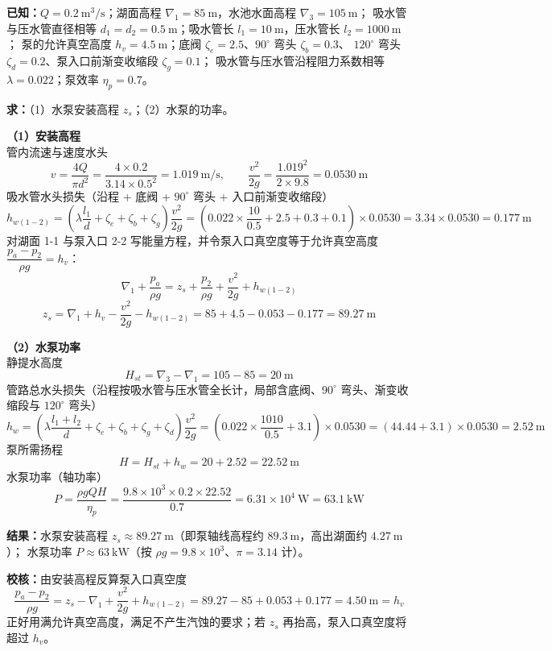\begin{jie}
\textbf{已知：}$Q=0.2\ \mathrm{m^3/s}$；湖面高程 $\nabla_1=85\ \mathrm{m}$，水池水面高程 $\nabla_3=105\ \mathrm{m}$；
吸水管与压水管直径相等 $d_1=d_2=0.5\ \mathrm{m}$；吸水管长 $l_1=10\ \mathrm{m}$，压水管长 $l_2=1000\ \mathrm{m}$；
泵的允许真空高度 $h_v=4.5\ \mathrm{m}$；底阀 $\zeta_e=2.5$、$90^\circ$ 弯头 $\zeta_b=0.3$、
$120^\circ$ 弯头 $\zeta_d=0.2$、泵入口前渐变收缩段 $\zeta_g=0.1$；
吸水管与压水管沿程阻力系数相等 $\lambda=0.022$；泵效率 $\eta_p=0.7$。

\textbf{求：}（1）水泵安装高程 $z_s$；（2）水泵的功率。

\textbf{（1）安装高程}\\
管内流速与速度水头
\[
v=\frac{4Q}{\pi d^{2}}=\frac{4\times0.2}{3.14\times0.5^{2}}=1.019\ \mathrm{m/s},\qquad
\frac{v^{2}}{2g}=\frac{1.019^{2}}{2\times9.8}=0.0530\ \mathrm{m}
\]
吸水管水头损失（沿程 + 底阀 + $90^\circ$ 弯头 + 入口前渐变收缩段）
\[
h_{w(1-2)}=\left(\lambda\frac{l_1}{d}+\zeta_e+\zeta_b+\zeta_g\right)\frac{v^{2}}{2g}
=\left(0.022\times\frac{10}{0.5}+2.5+0.3+0.1\right)\times0.0530=3.34\times0.0530=0.177\ \mathrm{m}
\]
对湖面 1-1 与泵入口 2-2 写能量方程，并令泵入口真空度等于允许真空高度
$\dfrac{p_a-p_2}{\rho g}=h_v$：
\[
\nabla_1+\frac{p_a}{\rho g}=z_s+\frac{p_2}{\rho g}+\frac{v^{2}}{2g}+h_{w(1-2)}
\]
\[
z_s=\nabla_1+h_v-\frac{v^{2}}{2g}-h_{w(1-2)}=85+4.5-0.053-0.177=89.27\ \mathrm{m}
\]

\textbf{（2）水泵功率}\\
静提水高度
\[
H_{st}=\nabla_3-\nabla_1=105-85=20\ \mathrm{m}
\]
管路总水头损失（沿程按吸水管与压水管全长计，局部含底阀、$90^\circ$ 弯头、渐变收缩段与 $120^\circ$ 弯头）
\[
h_w=\left(\lambda\frac{l_1+l_2}{d}+\zeta_e+\zeta_b+\zeta_g+\zeta_d\right)\frac{v^{2}}{2g}
=\left(0.022\times\frac{1010}{0.5}+3.1\right)\times0.0530=(44.44+3.1)\times0.0530=2.52\ \mathrm{m}
\]
泵所需扬程
\[
H=H_{st}+h_w=20+2.52=22.52\ \mathrm{m}
\]
水泵功率（轴功率）
\[
P=\frac{\rho gQH}{\eta_p}=\frac{9.8\times10^{3}\times0.2\times22.52}{0.7}=6.31\times10^{4}\ \mathrm{W}=63.1\ \mathrm{kW}
\]

\textbf{结果：}水泵安装高程 $z_s\approx89.27\ \mathrm{m}$（即泵轴线高程约 $89.3\ \mathrm{m}$，高出湖面约 $4.27\ \mathrm{m}$）；
水泵功率 $P\approx63\ \mathrm{kW}$（按 $\rho g=9.8\times10^{3}$、$\pi=3.14$ 计）。

\textbf{校核：}由安装高程反算泵入口真空度
\[
\frac{p_a-p_2}{\rho g}=z_s-\nabla_1+\frac{v^{2}}{2g}+h_{w(1-2)}=89.27-85+0.053+0.177=4.50\ \mathrm{m}=h_v
\]
正好用满允许真空高度，满足不产生汽蚀的要求；若 $z_s$ 再抬高，泵入口真空度将超过 $h_v$。
\end{jie}

